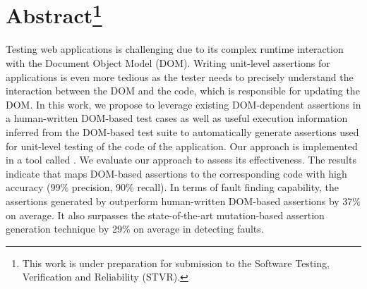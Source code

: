 \section*{Abstract\footnote{This work is under preparation for submission to the Software Testing, Verification and Reliability (STVR).}}
Testing \javascript web applications is challenging due to its complex runtime interaction with the Document Object Model (DOM). Writing unit-level assertions for \javascript applications is even more tedious as the tester needs to precisely understand the interaction between the DOM and the \javascript code, which is responsible for updating the DOM. In this work, we propose to leverage existing DOM-dependent assertions in a human-written DOM-based test cases as well as useful execution information inferred from the DOM-based test suite to automatically generate assertions used for unit-level testing of the \javascript code of the application. Our approach is implemented in a tool called \atrina. We evaluate our approach to assess its effectiveness. The results indicate that \atrina maps DOM-based assertions to the corresponding \javascript code with high accuracy (99\% precision, 90\% recall). In terms of fault finding capability, the assertions generated by \atrina outperform human-written DOM-based assertions by 37\% on average. It also surpasses the state-of-the-art mutation-based assertion generation technique by 29\% on average in detecting faults.